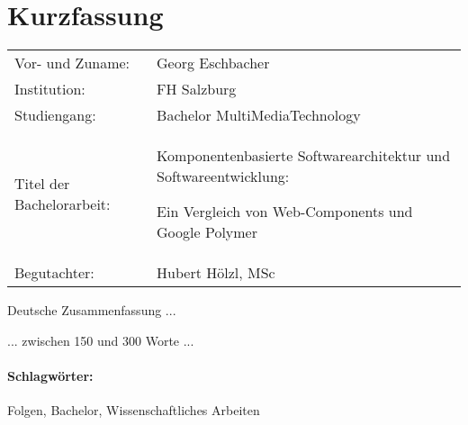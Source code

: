 \section*{Kurzfassung}
\begin{tabular}{p{4cm} p{12cm}}
Vor- und Zuname:& Georg Eschbacher\\
Institution: & FH Salzburg\\
Studiengang: &  Bachelor MultiMediaTechnology\\
Titel der Bachelorarbeit: & Komponentenbasierte Softwarearchitektur und Softwareentwicklung: \par Ein Vergleich von Web-Components und Google Polymer\\
Begutachter: & Hubert Hölzl, MSc\\
\end{tabular}
\vspace{0.5cm}

Deutsche Zusammenfassung ...

... zwischen 150 und 300 Worte ...


\paragraph{Schlagwörter:}
Folgen, Bachelor, Wissenschaftliches Arbeiten
